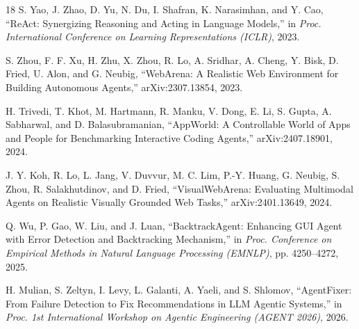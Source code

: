 \documentclass[conference]{IEEEtran}
\begin{document}
\begin{thebibliography}{18}
S. Yao, J. Zhao, D. Yu, N. Du, I. Shafran, K. Narasimhan, and Y. Cao,
``ReAct: Synergizing Reasoning and Acting in Language Models,''
in \textit{Proc. International Conference on Learning Representations (ICLR)}, 2023.

S. Zhou, F. F. Xu, H. Zhu, X. Zhou, R. Lo, A. Sridhar, A. Cheng,
Y. Bisk, D. Fried, U. Alon, and G. Neubig,
``WebArena: A Realistic Web Environment for Building Autonomous Agents,''
arXiv:2307.13854, 2023.

H. Trivedi, T. Khot, M. Hartmann, R. Manku, V. Dong, E. Li,
S. Gupta, A. Sabharwal, and D. Balasubramanian,
``AppWorld: A Controllable World of Apps and People for Benchmarking Interactive Coding Agents,''
arXiv:2407.18901, 2024.

J. Y. Koh, R. Lo, L. Jang, V. Duvvur, M. C. Lim, P.-Y. Huang,
G. Neubig, S. Zhou, R. Salakhutdinov, and D. Fried,
``VisualWebArena: Evaluating Multimodal Agents on Realistic Visually Grounded Web Tasks,''
arXiv:2401.13649, 2024.

Q. Wu, P. Gao, W. Liu, and J. Luan,
``BacktrackAgent: Enhancing GUI Agent with Error Detection and Backtracking Mechanism,''
in \textit{Proc. Conference on Empirical Methods in Natural Language Processing (EMNLP)},
pp. 4250--4272, 2025.

H. Mulian, S. Zeltyn, I. Levy, L. Galanti, A. Yaeli, and S. Shlomov,
``AgentFixer: From Failure Detection to Fix Recommendations in LLM Agentic Systems,''
in \textit{Proc. 1st International Workshop on Agentic Engineering (AGENT 2026)},
2026.

\end{thebibliography}
\end{document}
